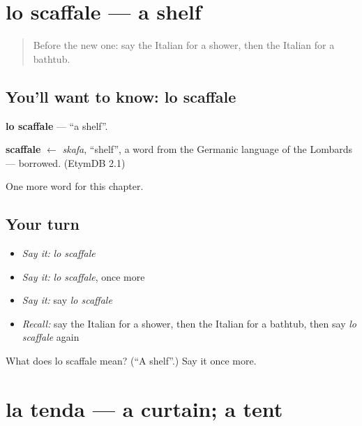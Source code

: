 \section[lo scaffale]{lo scaffale — a shelf}

\label{lesson:IT-C95-scaffale}



\begin{quote}
Before the new one: say the Italian for a shower, then the Italian for a bathtub.
\end{quote}

\subsection*{You'll want to know: lo scaffale}
\textbf{lo scaffale} — \textquotedblleft{}a shelf\textquotedblright{}.

\begin{cousinweb}
\textbf{scaffale} $\leftarrow$ \emph{skafa}, \textquotedblleft{}shelf\textquotedblright{}, a word from the Germanic language of the Lombards — borrowed. (EtymDB 2.1)
\end{cousinweb}

\begin{grammarlens}[title={What you've built}]
One more word for this chapter.
\end{grammarlens}

\subsection*{Your turn}
\begin{itemize}
\raggedright
  \item \emph{Say it:} \emph{lo scaffale}
  \item \emph{Say it:} \emph{lo scaffale}, once more
  \item \emph{Say it:} say \emph{lo scaffale}
  \item \emph{Recall:} say the Italian for a shower, then the Italian for a bathtub, then say \emph{lo scaffale} again
\end{itemize}

\begin{tcolorbox}[breakable,colback=teal!4,colframe=teal!35!black,title={Before you move on}]
What does lo scaffale mean? (\textquotedblleft{}A shelf\textquotedblright{}.) Say it once more.
\end{tcolorbox}
\section[la tenda]{la tenda — a curtain; a tent}

